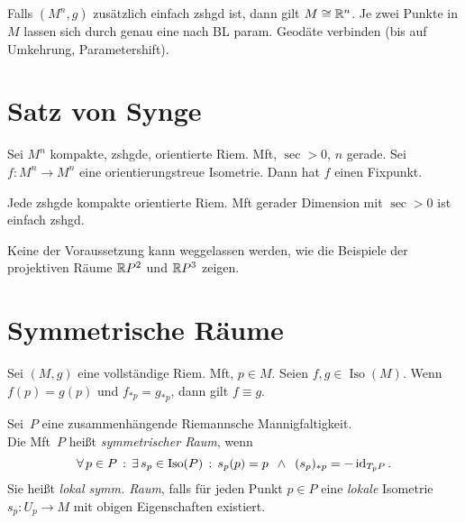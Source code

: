 \documentclass{cheat-sheet}
\DeclareMathOperator{\Iso}{Iso} %
\begin{document}

\begin{kor}
  Falls $(M^n, g)$ zusätzlich einfach zshgd ist, dann gilt $M \cong \mathbb{R}^n$.
  Je zwei Punkte in $M$ lassen sich durch genau eine nach BL param. Geodäte verbinden (bis auf Umkehrung, Parametershift).
\end{kor}

\section{Satz von Synge}

\begin{satz}
  Sei $M^n$ kompakte, zshgde, orientierte Riem. Mft, $\sec > 0$, $n$ gerade. Sei $f : M^n \to M^n$ eine orientierungstreue Isometrie. Dann hat $f$ einen Fixpunkt.
\end{satz}

\begin{satz}
  Jede zshgde kompakte orientierte Riem. Mft gerader Dimension mit $\sec > 0$ ist einfach zshgd.
\end{satz}

\begin{bem}
  Keine der Voraussetzung kann weggelassen werden, wie die Beispiele der projektiven Räume $\mathbb{R} P^2$ und $\mathbb{R} P^3$ zeigen.
\end{bem}


\section{Symmetrische Räume}

\begin{prop}
  Sei $(M, g)$ eine vollständige Riem. Mft, $p \in M$. Seien $f, g \in \Iso(M)$. Wenn $f(p) = g(p)$ und $f_{*p} = g_{*p}$, dann gilt $f \equiv g$.
\end{prop}

\begin{defn}
  Sei~$P$ eine zusammenhängende Riemannsche Mannigfaltigkeit. \\
  Die Mft~$P$ heißt \emph{symmetrischer Raum}, wenn
  \[
    \fa{p \in P} \ex{s_p \in \Iso(P)}
    s_p(p) = p \enspace \wedge \enspace (s_p)_{*p} = - \id_{T_p P}.
  \]
  Sie heißt \emph{lokal symm. Raum}, falls für jeden Punkt $p \in P$ eine \textit{lokale} Isometrie $s_p : U_p \to M$ mit obigen Eigenschaften existiert.
\end{defn}
\end{document}

